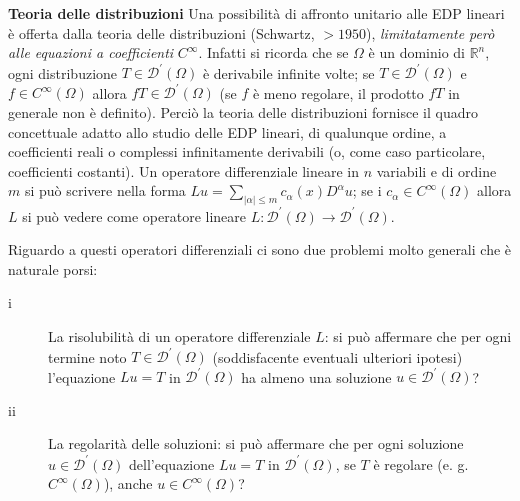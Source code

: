 \documentclass{article}
\begin{document}
\textbf{Teoria delle distribuzioni} Una possibilit\`{a} di affronto unitario
alle EDP lineari \`{e} offerta dalla teoria delle distribuzioni (Schwartz, $%
>1950$), \textit{limitatamente per\`{o} alle equazioni a coefficienti }$%
C^{\infty }$. Infatti si ricorda che se $%
\Omega
$ \`{e} un dominio di $%
\mathbb{R}
^{n}$, ogni distribuzione $T\in \mathcal{D}^{\prime }(%
\Omega
)$ \`{e} derivabile infinite volte; se $T\in \mathcal{D}^{\prime }(%
\Omega
)$ e $f\in C^{\infty }\left( \Omega \right) $ allora $fT\in \mathcal{D}%
^{\prime }(%
\Omega
)$ (se $f$ \`{e} meno regolare, il prodotto $fT$ in generale non \`{e}
definito). Perci\`{o} la teoria delle distribuzioni fornisce il quadro
concettuale adatto allo studio delle EDP lineari, di qualunque ordine, a
coefficienti reali o complessi infinitamente derivabili (o, come caso
particolare, coefficienti costanti). Un operatore differenziale lineare in $%
n $ variabili e di ordine $m$ si pu\`{o} scrivere nella forma $%
Lu=\sum_{\left\vert \alpha \right\vert \leq m}c_{\alpha }\left( x\right)
D^{\alpha }u$; se i $c_{\alpha }\in C^{\infty }\left( \Omega \right) $
allora $L$ si pu\`{o} vedere come operatore lineare $L:\mathcal{D}^{\prime }(%
\Omega
)\rightarrow \mathcal{D}^{\prime }(%
\Omega
)$.

Riguardo a questi operatori differenziali ci sono due problemi molto
generali che \`{e} naturale porsi:

\begin{description}
\item[i] La risolubilit\`{a} di un operatore differenziale $L$: si pu\`{o}
affermare che per ogni termine noto $T\in \mathcal{D}^{\prime }(%
\Omega
)$ (soddisfacente eventuali ulteriori ipotesi) l'equazione $Lu=T$ in $%
\mathcal{D}^{\prime }(%
\Omega
)$ ha almeno una soluzione $u\in \mathcal{D}^{\prime }(%
\Omega
)$?

\item[ii] La regolarit\`{a} delle soluzioni: si pu\`{o} affermare che per
ogni soluzione $u\in \mathcal{D}^{\prime }(%
\Omega
)$ dell'equazione $Lu=T$ in $\mathcal{D}^{\prime }(%
\Omega
)$, se $T$ \`{e} regolare (e. g. $C^{\infty }\left( \Omega \right) $), anche 
$u\in C^{\infty }\left( \Omega \right) $?
\end{description}
\end{document}
